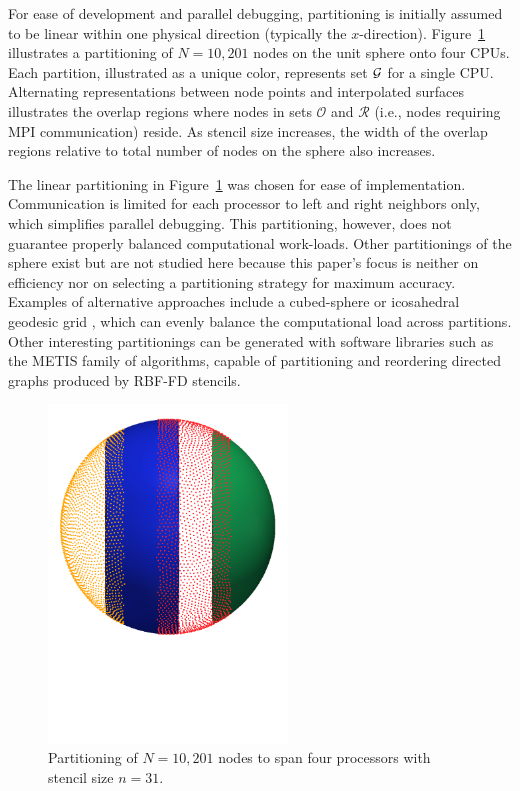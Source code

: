 For ease of development and parallel debugging, partitioning is initially
assumed to be linear within one physical direction (typically the
$x$-direction). Figure~\ref{fig:decomposed_sphere} illustrates a partitioning of
$N=10,201$ nodes on the unit sphere onto four CPUs. Each partition, illustrated
as a unique color, represents set $\mathcal{G}$ for a single CPU.  Alternating
representations between node points and interpolated surfaces illustrates the
overlap regions where nodes in sets $\mathcal{O}$ and $\mathcal{R}$ (i.e., nodes
requiring MPI communication) reside. As stencil size increases, the width of the
overlap regions relative to total number of nodes on the sphere also increases. 



The linear partitioning in Figure~\ref{fig:decomposed_sphere} was chosen for ease of implementation. Communication is limited for each
processor to left and right neighbors only, which simplifies parallel debugging. This partitioning, however, does not guarantee properly balanced computational work-loads.  Other partitionings of the sphere exist but are not studied here because this paper's focus is neither on efficiency nor on selecting a partitioning strategy for maximum accuracy. Examples of alternative approaches include a cubed-sphere \cite{Ivan2011} or icosahedral geodesic grid \cite{Randall2002}, which can evenly balance the computational load across partitions. Other interesting partitionings can be generated with software libraries such as the METIS \cite{Karypis1999} family of algorithms, capable of partitioning and reordering directed graphs produced by RBF-FD stencils. 

\begin{figure}[ht!]
\begin{center}
\includegraphics[width=2.5in]{figures/paper1/figures/vortex_rollup/4procs_N10K_n31.pdf}
\caption{Partitioning of $N=10,201$ nodes to span four processors with stencil size $n=31$.  }
\label{fig:decomposed_sphere}
\end{center}
\end{figure}

